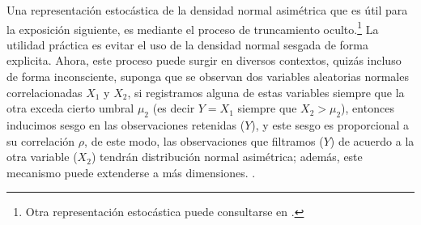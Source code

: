 \documentclass[11pt]{article}
\begin{document}
Una representación estocástica de la densidad normal asimétrica que es útil para la exposición siguiente, es mediante el proceso de truncamiento oculto.\footnote{Otra representación estocástica puede consultarse en \textcite{cristian-2007}.} La utilidad práctica es evitar el uso de la densidad normal sesgada de forma explicita. Ahora, este proceso puede surgir en diversos contextos, quizás incluso de forma inconsciente, suponga que se observan dos variables aleatorias normales correlacionadas $X_{1}$ y $X_{2}$, si registramos alguna de estas variables siempre que la otra exceda cierto umbral $\mu_{2}$ (es decir $Y=X_{1}$ siempre que $X_{2}>\mu_{2}$), entonces inducimos sesgo en las observaciones retenidas ($Y$), y este sesgo es proporcional a  su correlación $\rho$, de este modo, las observaciones que filtramos ($Y$) de acuerdo a la otra variable ($X_{2}$) tendrán distribución normal asimétrica; además, este mecanismo puede extenderse a más dimensiones. \parencite[][]{Azzalini:2013, arellano:2008, arnold-hidden1}.
\end{document}

